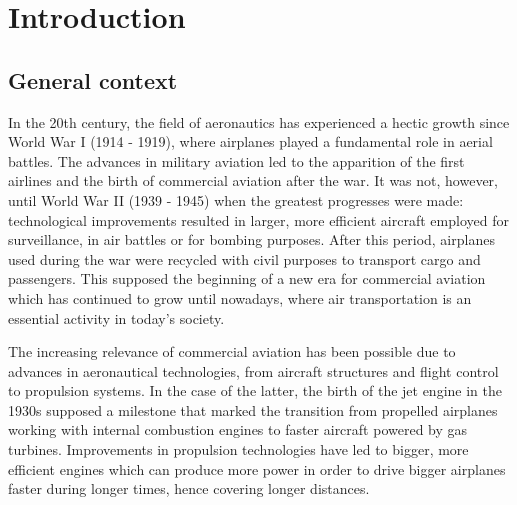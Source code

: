 \chapter{Introduction}
\label{ch1:introduction}

    

\section{General context}





In the 20th century, the field of aeronautics has experienced a hectic growth since World War I (1914 - 1919), where airplanes played a fundamental role in aerial battles. The advances in military aviation led to the apparition of the first airlines and the birth of commercial aviation after the war. It was not, however, until World War II (1939 - 1945) when the greatest progresses were made: technological improvements resulted in larger, more efficient aircraft employed for surveillance, in air battles or for bombing purposes. After this period, airplanes used during the war were recycled with civil purposes to transport cargo and passengers. This supposed the beginning of a new era for commercial aviation which has continued to grow until nowadays, where air transportation is an essential activity in today's society.

The increasing relevance of commercial aviation has been possible due to advances in aeronautical technologies, from aircraft structures and flight control to propulsion systems. In the case of the latter, the birth of the jet engine in the 1930s supposed a milestone that marked the transition from propelled airplanes working with internal combustion engines to faster aircraft powered by gas turbines. Improvements in propulsion technologies have led to bigger, more efficient engines which can produce more power in order to drive bigger airplanes faster during longer times, hence covering longer distances. 

